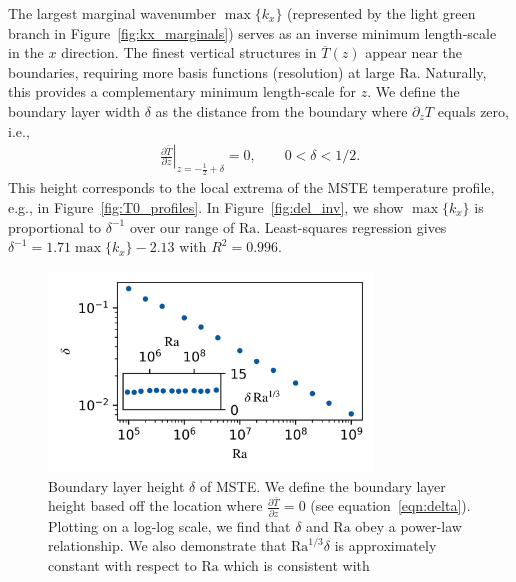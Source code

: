 \documentclass[reprint,amsmath,amssymb,aps,nofootinbib]{revtex4-1}
\newcommand\Ra{\mathrm{Ra}}
\renewcommand{\vec}[1]{\boldsymbol{#1}}
\begin{document}
The largest marginal wavenumber $\max \{ k_x \}$ (represented by the light green branch in Figure~\ref{fig:kx_marginals}) serves as an inverse minimum length-scale in the $x$ direction.
The finest vertical structures in $\overline{T}(z)$ appear near the boundaries, requiring more basis functions (resolution) at large $\Ra$.
Naturally, this provides a complementary minimum length-scale for $z$.
We define the boundary layer width $\delta$ as the distance from the boundary where $\partial_z T$ equals zero, i.e.,
\begin{align}\label{eqn:delta}
    \left.\frac{\partial \overline{T}}{\partial z}\right|_{z=-\frac{1}{2}+\delta} = 0, \qquad 0 < \delta < 1/2.
\end{align}
This height corresponds to the local extrema of the MSTE temperature profile, e.g., in Figure~\ref{fig:T0_profiles}.
In Figure~\ref{fig:del_inv}, we show $\max \{ k_x\}$ is proportional to $\delta^{-1}$ over our range of $\Ra$.
Least-squares regression gives $\delta^{-1} = 1.71 \max \{ k_x \} - 2.13$ with $R^2 = 0.996$.

\begin{figure}
    \centering
    \includegraphics[width=3.4in]{del_ra.PNG}
    \caption{Boundary layer height $\delta$ of MSTE. 
    We define the boundary layer height based off the location where $\frac{\partial \overline{T}}{\partial z} = 0$ (see equation~\ref{eqn:delta}). 
    Plotting on a log-log scale, we find that $\delta$ and $\Ra$ obey a power-law relationship. We also demonstrate that $\Ra^{1/3}\delta$ is approximately constant with respect to $\Ra$ which is consistent with \cite{Malkus_1954}}
    \label{fig:bl_ra}
\end{figure}
\end{document}
